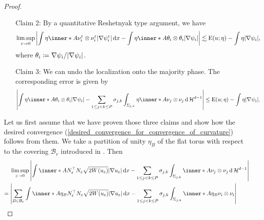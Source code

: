 \begin{proof}
\begin{itemize}[wide=0pt]
		\item[Claim 2:]
		By a quantitative Reshetnyak type argument, we have
		\begin{equation*}
			\limsup_{ \varepsilon \to 0 }
				\abs{
					\int
						\eta \inner*{ A }{ \nu_{ i }^{ \varepsilon } \otimes \nu_{ i }^{ \varepsilon } }
						\abs{ \nabla \psi_{ i }^{ \varepsilon } }
					\dd{ x }
					-
					\int
						\eta \inner*{ A }{ \theta_{ i }  \otimes 
						\theta_{ i } }
					\abs{ \nabla \psi_{ i } }
				}
			\lesssim
				\energy ( u ; \eta ) - \int \eta \abs{ \nabla \psi_{ i } },
		\end{equation*}
		where $ \theta_{ i } \coloneqq \nabla \psi_{ i } / \abs{ \nabla \psi_{ 
		i } } $.
		\item[Claim 3:] 
		We can undo the localization onto the majority phase. The corresponding error is given by
		\begin{equation*}
			\abs{ 
				\int
					\eta
					\inner*{ A }{ \theta_{ i } \otimes \theta_{ i } }
				\abs{ \nabla \psi_{ i } }
				-
				\sum_{ 1 \leq j < k \leq P }
					\sigma_{ j , k }
					\int_{ \Sigma_{ j , k } }
						\eta 
						\inner*{ A }{ \nu_{ j } \otimes \nu_{ j } }
					\dd{ \hm^{ d - 1 } }
			}
		\leq
		\energy ( u ; \eta ) - \int \eta \abs{ \nabla \psi_{ i } }.
		\end{equation*}
	\end{itemize}
	Let us first assume that we have proven those three claims and show how the desired convergence (\ref{desired_convergence_for_convergence_of_curvature}) follows from them. 
	We take a partition of unity $ \eta_{ B } $ of the flat torus with respect 
	to the covering $ \mathcal{ B }_{ r } $ introduced in 
	. Then
	\begin{align*}
		& \limsup_{ \varepsilon \to 0 }
			\abs{
				\int
					\inner*{ A }{ N_{ \varepsilon }^{ \top } N_{ \varepsilon } }
					\sqrt{ 2 W ( u_{ \varepsilon } ) }
					\abs{ \nabla u_{ \varepsilon } }
				\dd{ x }
				-
				\sum_{ 1 \leq j < k \leq P }
					\sigma_{ j , k }
				 	\int_{ \Sigma_{ j , k } }
				 		\inner*{ A }{ \nu_{ j } \otimes \nu_{ j } }
				 	\dd{ \hm^{ d - 1 } }
			} 
		\\
		={} &
		\abs{ 
			\sum_{ B \in \mathcal{ B }_{ r } }
				\int
					\inner*{ A \eta_{ B } }
					{ N_{ \varepsilon }^{ \top } N_{ \varepsilon } }
					\sqrt{ 2 W ( u_{ \varepsilon } ) } \abs{ \nabla u_{ \varepsilon } }
				\dd{ x }
			-
			\sum_{ 1 \leq j < k \leq P }
				\sigma_{ j , k }
				\int_{ \Sigma_{ j , k } }
					\inner*{ A \eta_{ B } }
					{ \nu_{ i } \otimes \nu_{i } }
}
\end{align*}
\end{proof}
